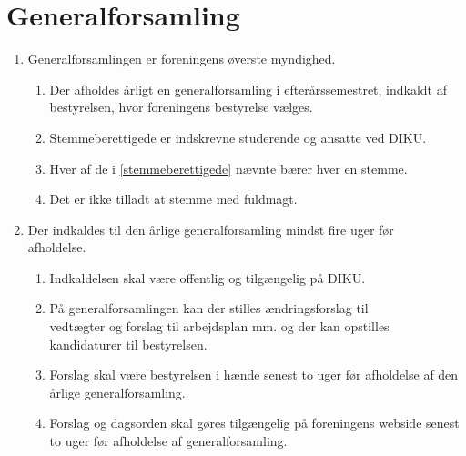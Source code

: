 \documentclass[a4paper]{article}
\newenvironment{stykenum}{
  \begin{enumerate}[%
    label=Stk.~\arabic*., ref=\textsection~\theenumi~Stk.~\arabic*, start=2]
}{\end{enumerate}}
\begin{document}
\section*{Generalforsamling}

\begin{enumerate}[resume*=afsnit]

\item \label{generalforsamling} \label{gf-start} Generalforsamlingen er
foreningens øverste myndighed.

  \begin{stykenum}

  \item Der afholdes årligt en generalforsamling i efterårssemestret, indkaldt
        af bestyrelsen, hvor foreningens bestyrelse vælges.

  \item \label{stemmeberettigede} Stemmeberettigede er indskrevne studerende og
        ansatte ved DIKU.

  \item Hver af de i \ref{stemmeberettigede} nævnte bærer hver en stemme.

  \item Det er ikke tilladt at stemme med fuldmagt.

  \end{stykenum}

\item Der indkaldes til den årlige generalforsamling mindst fire uger før\\ afholdelse.

  \begin{stykenum}

  \item Indkaldelsen skal være offentlig og tilgængelig på DIKU.

  \item På generalforsamlingen kan der stilles ændringsforslag til\\vedtægter og
        forslag til arbejdsplan mm. og der kan opstilles\\kandidaturer til
        bestyrelsen.

  \item Forslag skal være bestyrelsen i hænde senest to uger før afholdelse af
        den årlige generalforsamling.

  \item Forslag og dagsorden skal gøres tilgængelig på foreningens webside
        senest to uger før afholdelse af generalforsamling.


\end{stykenum}
\end{enumerate}
\end{document}
